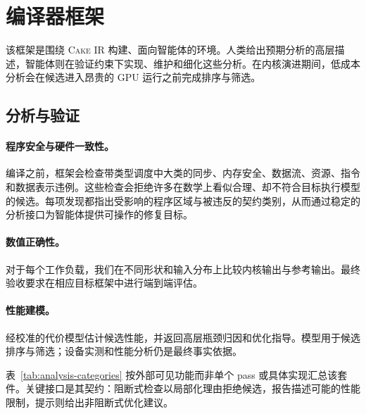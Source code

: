 \documentclass[10pt]{article}
\newcommand{\cakeir}{\textsc{Cake IR}}
\begin{document}
\section{编译器框架}
\label{sec:harness}

该框架是围绕 \cakeir{} 构建、面向智能体的环境。人类给出预期分析的高层描述，智能体则在验证约束下实现、维护和细化这些分析。在内核演进期间，低成本分析会在候选进入昂贵的 GPU 运行之前完成排序与筛选。

\subsection{分析与验证}
\label{sec:analysis}

\paragraph{程序安全与硬件一致性。}
编译之前，框架会检查带类型调度中大类的同步、内存安全、数据流、资源、指令和数据表示违例。这些检查会拒绝许多在数学上看似合理、却不符合目标执行模型的候选。每项发现都指出受影响的程序区域与被违反的契约类别，从而通过稳定的分析接口为智能体提供可操作的修复目标。

\paragraph{数值正确性。}
对于每个工作负载，我们在不同形状和输入分布上比较内核输出与参考输出。最终验收要求在相应目标框架中进行端到端评估。

\paragraph{性能建模。}
经校准的代价模型估计候选性能，并返回高层瓶颈归因和优化指导。模型用于候选排序与筛选；设备实测和性能分析仍是最终事实依据。

表~\ref{tab:analysis-categories} 按外部可见功能而非单个 pass 或具体实现汇总该套件。关键接口是其契约：阻断式检查以局部化理由拒绝候选，报告描述可能的性能限制，提示则给出非阻断式优化建议。
\end{document}

